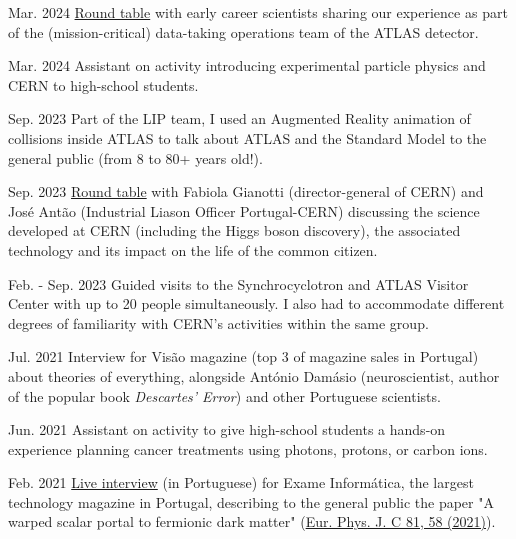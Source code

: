 
\begin{cventries}
    
    {}{Mar. 2024}
    {\href{https://indico.cern.ch/event/1378416/overview}{Round table} with early career scientists sharing our experience as part of the (mission-critical) data-taking operations team of the ATLAS detector.}

    {}{Mar. 2024}
    {Assistant on activity introducing experimental particle physics and CERN to high-school students.}

    {}{Sep. 2023}
    {Part of the LIP team, I used an Augmented Reality animation of collisions inside ATLAS to talk about ATLAS and the Standard Model to the general public (from 8 to 80+ years old!).} 

    {}{Sep. 2023}
    {\href{https://www.cienciaviva.pt/divulgacao-cientifica/o-bosao-de-higgs-e-as-nossas-vidas}{Round table} with Fabiola Gianotti (director-general of CERN) and José Antão (Industrial Liason Officer Portugal-CERN) discussing the science developed at CERN (including the Higgs boson discovery), the associated technology and its impact on the life of the common citizen.}

    {}{Feb. - Sep. 2023}
    {Guided visits to the Synchrocyclotron and ATLAS Visitor Center with up to 20 people simultaneously. I also had to accommodate different degrees of familiarity with CERN's activities within the same group.}

    {}{Jul. 2021}
    {Interview for Visão magazine (top 3 of magazine sales in Portugal) about theories of everything, alongside António Damásio (neuroscientist, author of the popular book \textit{Descartes' Error}) and other Portuguese scientists.}

    {}{Jun. 2021}
    {Assistant on activity to give high-school students a hands-on experience planning cancer treatments using photons, protons, or carbon ions.}

    {}{Feb. 2021}
    {\href{https://visao.pt/exameinformatica/videos-ei/eilive/2021-02-08-cromo-da-semana-novas-particulas-atomicas-e-a-quinta-dimensao/}{Live interview} (in Portuguese) for Exame Informática, the largest technology magazine in Portugal, describing to the general public the paper "A warped scalar portal to fermionic dark matter" (\href{https://doi.org/10.1140/epjc/s10052-021-08851-0}{Eur. Phys. J. C 81, 58 (2021)}). }


\end{cventries}

